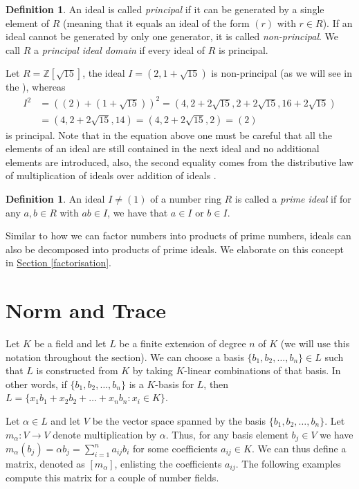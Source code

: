 \documentclass[openany, a4paper, 10pt]{book}
\theoremstyle{plain}
\theoremstyle{plain}
\theoremstyle{plain}
\theoremstyle{definition}
\newtheorem{definition}[theorem]{Definition}
\theoremstyle{plain}
\theoremstyle{definition}
\theoremstyle{remark}
\newcommand{\secref}[1]{\hyperref[#1]{Section \ref{#1}}}
\begin{document}
\begin{definition}\label{is_principal}
    An ideal is called \textit{principal} if it can be generated by a single element of $R$ (meaning that it equals an ideal of the form $(r)$ with $r \in R$).
    If an ideal cannot be generated by only one generator, it is called \textit{non-principal}.
    We call $R$ a \textit{principal ideal domain} if every ideal of $R$ is principal.
\end{definition}
\begin{examplebox}
    Let $R=\mathbb Z[\sqrt{15}]$, the ideal $I=(2, 1+\sqrt{15})$
    is non-principal (as we will see in the ), whereas
    \begin{align*}
        I^2&=((2) + (1+\sqrt{15}))^2 = (4,2+2\sqrt{15},2+2\sqrt{15},16 + 2\sqrt{15})\\
           &= (4, 2+2\sqrt{15}, 14) = (4, 2+2\sqrt{15}, 2) = (2)
    \end{align*}
    is principal.
    Note that in the equation above one must be careful that all the elements of an ideal are still contained in the next ideal and no additional elements are introduced, also, the second equality comes from the distributive law of multiplication of ideals over addition of ideals \cite[p.~15]{ANT_dictaat}.
\end{examplebox}

\begin{definition}\label{prime_ideal}
    An ideal $I \neq (1)$ of a number ring $R$ is called a \textit{prime ideal} if
    for any $a, b \in R$ with $ab \in I$, we have that $a \in I$ or $b \in I$.
\end{definition}
Similar to how we can factor numbers into products of prime numbers, ideals can also be decomposed into products of prime ideals.
We elaborate on this concept in \secref{factorisation}.

\section{Norm and Trace}\label{sec:norm_trace}
Let $K$ be a field and let $L$ be a finite extension of degree $n$ of $K$ (we will use this notation throughout the section).
We can choose a basis $\{b_1, b_2, \dots, b_n\} \in L$ such that $L$ is constructed from $K$
by taking $K$-linear combinations of that basis.
In other words, if $\{b_1, b_2, \dots, b_n\}$ is a $K$-basis for $L$, then
$L = \{ x_1b_1 + x_2b_2 + \dots + x_nb_n: x_i \in K \}.$

Let $\alpha \in L$ and let $V$ be the vector space spanned by the basis $\{b_1, b_2, \dots, b_n\}$.
Let $m_\alpha: V \to V$ denote multiplication by $\alpha$.
Thus, for any basis element $b_j \in V$ we have $m_\alpha(b_j) = \alpha b_j = \sum_{i=1}^n a_{ij} b_i$ for some coefficients $a_{ij} \in K$.
We can thus define a matrix, denoted as $[m_\alpha]$, enlisting the coefficients $a_{ij}$.
The following examples compute this matrix for a couple of number fields.
\end{document}
